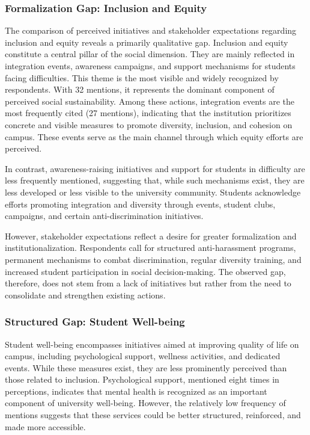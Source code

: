 \documentclass[12pt,a4paper]{article}
\begin{document}
\subsubsection{Formalization Gap: Inclusion and Equity}

The comparison of perceived initiatives and stakeholder expectations regarding inclusion and equity reveals a primarily qualitative gap. Inclusion and equity constitute a central pillar of the social dimension. They are mainly reflected in integration events, awareness campaigns, and support mechanisms for students facing difficulties. This theme is the most visible and widely recognized by respondents. With 32 mentions, it represents the dominant component of perceived social sustainability. Among these actions, integration events are the most frequently cited (27 mentions), indicating that the institution prioritizes concrete and visible measures to promote diversity, inclusion, and cohesion on campus. These events serve as the main channel through which equity efforts are perceived.

In contrast, awareness-raising initiatives and support for students in difficulty are less frequently mentioned, suggesting that, while such mechanisms exist, they are less developed or less visible to the university community. Students acknowledge efforts promoting integration and diversity through events, student clubs, campaigns, and certain anti-discrimination initiatives.

However, stakeholder expectations reflect a desire for greater formalization and institutionalization. Respondents call for structured anti-harassment programs, permanent mechanisms to combat discrimination, regular diversity training, and increased student participation in social decision-making. The observed gap, therefore, does not stem from a lack of initiatives but rather from the need to consolidate and strengthen existing actions.

\subsubsection{Structured Gap: Student Well-being}

Student well-being encompasses initiatives aimed at improving quality of life on campus, including psychological support, wellness activities, and dedicated events. While these measures exist, they are less prominently perceived than those related to inclusion. Psychological support, mentioned eight times in perceptions, indicates that mental health is recognized as an important component of university well-being. However, the relatively low frequency of mentions suggests that these services could be better structured, reinforced, and made more accessible.
\end{document}
